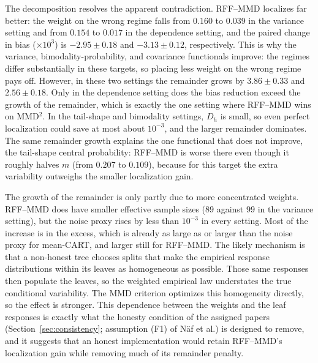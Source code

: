 \documentclass[12pt,a4paper]{article}
\newcommand{\1}{\mathbf 1}
\begin{document}
The decomposition resolves the apparent contradiction. RFF--MMD localizes far better: the weight on the wrong regime falls from $0.160$ to $0.039$ in the variance setting and from $0.154$ to $0.017$ in the dependence setting, and the paired change in bias ($\times10^3$) is $-2.95\pm0.18$ and $-3.13\pm0.12$, respectively. This is why the variance, bimodality-probability, and covariance functionals improve: the regimes differ substantially in these targets, so placing less weight on the wrong regime pays off. However, in these two settings the remainder grows by $3.86\pm0.33$ and $2.56\pm0.18$. Only in the dependence setting does the bias reduction exceed the growth of the remainder, which is exactly the one setting where RFF--MMD wins on MMD$^2$. In the tail-shape and bimodality settings, $D_h$ is small, so even perfect localization could save at most about $10^{-3}$, and the larger remainder dominates. The same remainder growth explains the one functional that does not improve, the tail-shape central probability: RFF--MMD is worse there even though it roughly halves $m$ (from $0.207$ to $0.109$), because for this target the extra variability outweighs the smaller localization gain.

The growth of the remainder is only partly due to more concentrated weights. RFF--MMD does have smaller effective sample sizes ($89$ against $99$ in the variance setting), but the noise proxy rises by less than $10^{-3}$ in every setting. Most of the increase is in the excess, which is already as large as or larger than the noise proxy for mean-CART, and larger still for RFF--MMD. The likely mechanism is that a non-honest tree chooses splits that make the empirical response distributions within its leaves as homogeneous as possible. Those same responses then populate the leaves, so the weighted empirical law understates the true conditional variability. The MMD criterion optimizes this homogeneity directly, so the effect is stronger. This dependence between the weights and the leaf responses is exactly what the honesty condition of the assigned papers (Section~\ref{sec:consistency}; assumption (F1) of N\"af et al.) is designed to remove, and it suggests that an honest implementation would retain RFF--MMD's localization gain while removing much of its remainder penalty.
\end{document}
